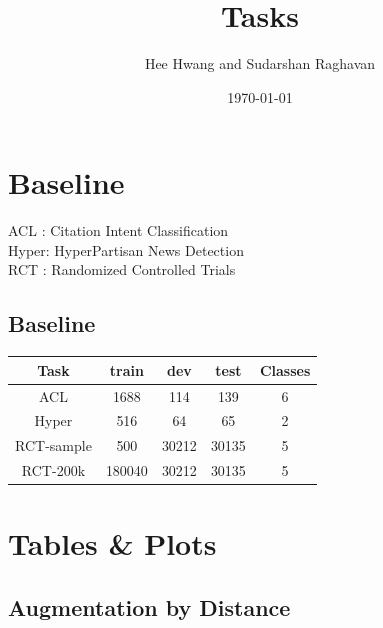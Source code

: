 \documentclass[11pt]{article}
\author{Hee Hwang and Sudarshan Raghavan}
\date{\today}
\title{Tasks}
\begin{document}
\maketitle






\section{Baseline}
\label{sec:org1e5a201}
ACL  : Citation Intent Classification\\
Hyper: HyperPartisan News Detection\\
RCT  : Randomized Controlled Trials

\subsection{Baseline}
\label{sec:orge3973ea}
\begin{center}
\begin{tabular}{|c|c|c|c|c|}
\hline
Task & train & dev & test & Classes\\
\hline
ACL & 1688 & 114 & 139 & 6\\
\hline
Hyper & 516 & 64 & 65 & 2\\
\hline
RCT-sample & 500 & 30212 & 30135 & 5\\
\hline
RCT-200k & 180040 & 30212 & 30135 & 5\\
\hline
\end{tabular}
\end{center}




\section{Tables \& Plots}
\label{sec:org732747b}

\subsection{Augmentation by Distance}
\label{sec:org9936a54}
\end{document}
